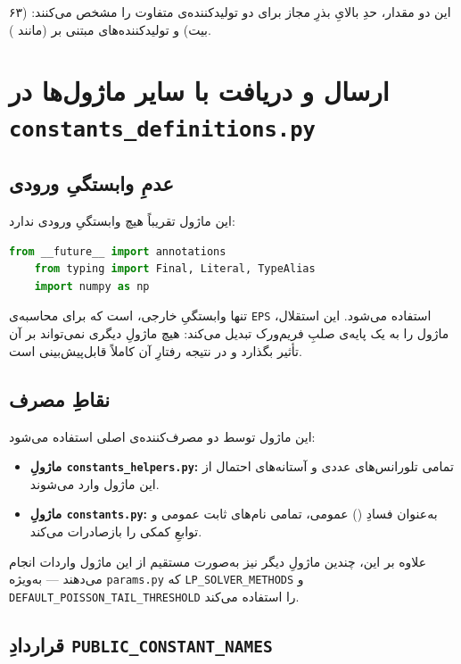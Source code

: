 این دو مقدار، حدِ بالایِ بذرِ مجاز برای دو تولیدکننده‌ی متفاوت را مشخص می‌کنند:  (۶۳ بیت) و تولیدکننده‌های مبتنی بر  (مانند ).

\section{ارسال و دریافت با سایر ماژول‌ها در \texttt{constants\_definitions.py}}

\subsection{عدمِ وابستگیِ ورودی}

این ماژول تقریباً هیچ وابستگیِ ورودی ندارد:

\begin{lstlisting}[language=Python]
	from __future__ import annotations
	from typing import Final, Literal, TypeAlias
	import numpy as np
\end{lstlisting}

تنها وابستگیِ خارجی،  است که برای محاسبه‌ی \texttt{EPS} استفاده می‌شود. این استقلال، ماژول را به یک پایه‌ی صلبِ فریم‌ورک تبدیل می‌کند: هیچ ماژولِ دیگری نمی‌تواند بر آن تأثیر بگذارد و در نتیجه رفتارِ آن کاملاً قابل‌پیش‌بینی است.

\subsection{نقاطِ مصرف}

این ماژول توسط دو مصرف‌کننده‌ی اصلی استفاده می‌شود:

\begin{itemize}
	\item \textbf{ماژولِ \texttt{constants\_helpers.py}:} تمامی تلورانس‌های عددی و آستانه‌های احتمال از این ماژول وارد می‌شوند.
	\item \textbf{ماژولِ \texttt{constants.py}:} به‌عنوان فسادِ () عمومی، تمامی نام‌های ثابت عمومی و توابعِ کمکی را بازصادرات می‌کند.
\end{itemize}

علاوه بر این، چندین ماژولِ دیگر نیز به‌صورت مستقیم از این ماژول واردات انجام می‌دهند — به‌ویژه \texttt{params.py} که \texttt{LP\_SOLVER\_METHODS} و \texttt{DEFAULT\_POISSON\_TAIL\_THRESHOLD} را استفاده می‌کند.

\subsection{قراردادِ \texttt{PUBLIC\_CONSTANT\_NAMES}}

